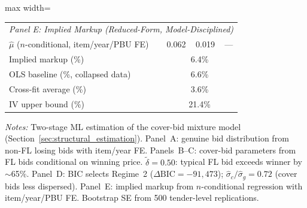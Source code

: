\begin{table}[htbp]
\begin{adjustbox}{max width=\textwidth}
\begin{threeparttable}
\begin{tabular}{lccc}
\midrule
\multicolumn{4}{l}{\textit{Panel E: Implied Markup (Reduced-Form, Model-Disciplined)}} \\[1pt]
$\hat{\mu}$ ($n$-conditional, item/year/PBU FE) & 0.062 & 0.019 & --- \\
Implied markup (\%) & \multicolumn{3}{c}{6.4\%} \\
OLS baseline (\%, collapsed data) & \multicolumn{3}{c}{6.6\%} \\
Cross-fit average (\%) & \multicolumn{3}{c}{3.6\%} \\
IV upper bound (\%) & \multicolumn{3}{c}{21.4\%} \\
\bottomrule
\end{tabular}
\begin{tablenotes}
\scriptsize
\item \textit{Notes:} Two-stage ML estimation of the cover-bid mixture model
(Section~\ref{sec:structural_estimation}). Panel~A: genuine bid distribution
from non-FL losing bids with item/year FE. Panels~B--C: cover-bid parameters
from FL bids conditional on winning price.
$\tilde{\delta} = 0.50$: typical FL bid exceeds winner by $\sim$65\%.
Panel~D: BIC selects Regime~2 ($\Delta\text{BIC} = -91{,}473$);
$\hat{\sigma}_c/\hat{\sigma}_g = 0.72$ (cover bids less dispersed).
Panel~E: implied markup from $n$-conditional regression with item/year/PBU FE.
Bootstrap SE from 500 tender-level replications.
\end{tablenotes}
\end{threeparttable}
\end{adjustbox}
\end{table}
